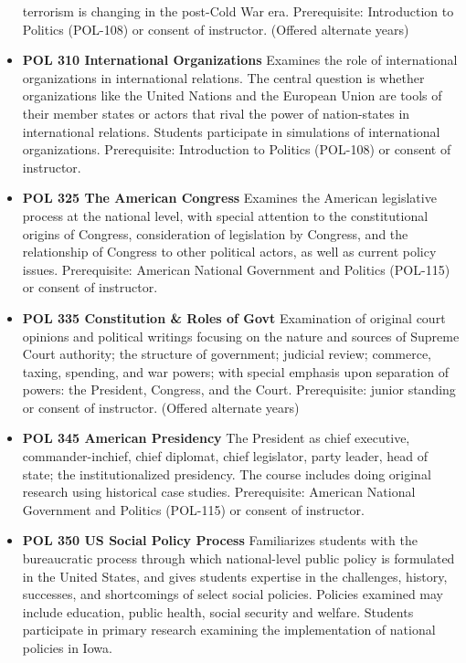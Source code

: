 \documentclass[
  letterpaper,
]{scrbook}
\begin{document}
\begin{itemize}
  terrorism is changing in the post-Cold War era. Prerequisite:
  Introduction to Politics (POL-108) or consent of instructor. (Offered
  alternate years)
\item
  \textbf{POL 310 International Organizations} Examines the role of
  international organizations in international relations. The central
  question is whether organizations like the United Nations and the
  European Union are tools of their member states or actors that rival
  the power of nation-states in international relations. Students
  participate in simulations of international organizations.
  Prerequisite: Introduction to Politics (POL-108) or consent of
  instructor.\\
\item
  \textbf{POL 325 The American Congress} Examines the American
  legislative process at the national level, with special attention to
  the constitutional origins of Congress, consideration of legislation
  by Congress, and the relationship of Congress to other political
  actors, as well as current policy issues. Prerequisite: American
  National Government and Politics (POL-115) or consent of instructor.
\item
  \textbf{POL 335 Constitution \& Roles of Govt} Examination of original
  court opinions and political writings focusing on the nature and
  sources of Supreme Court authority; the structure of government;
  judicial review; commerce, taxing, spending, and war powers; with
  special emphasis upon separation of powers: the President, Congress,
  and the Court. Prerequisite: junior standing or consent of instructor.
  (Offered alternate years)
\item
  \textbf{POL 345 American Presidency} The President as chief executive,
  commander-inchief, chief diplomat, chief legislator, party leader,
  head of state; the institutionalized presidency. The course includes
  doing original research using historical case studies. Prerequisite:
  American National Government and Politics (POL-115) or consent of
  instructor.
\item
  \textbf{POL 350 US Social Policy Process} Familiarizes students with
  the bureaucratic process through which national-level public policy is
  formulated in the United States, and gives students expertise in the
  challenges, history, successes, and shortcomings of select social
  policies. Policies examined may include education, public health,
  social security and welfare. Students participate in primary research
  examining the implementation of national policies in Iowa.

\end{itemize}
\end{document}
